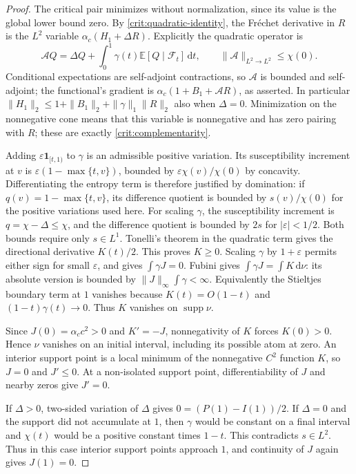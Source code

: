 \documentclass[11pt,a4paper]{article}
\numberwithin{equation}{section}
\theoremstyle{definition}
\theoremstyle{remark}
\newcommand{\E}{\mathbb E}
\newcommand{\dd}{\mathrm d}
\newcommand{\ind}{\mathbf 1}
\newcommand{\eps}{\varepsilon}
\DeclareMathOperator{\supp}{supp}
\begin{document}
\begin{proof}
The critical pair minimizes without normalization, since its value is
the global lower bound zero.  By \eqref{crit:quadratic-identity}, the
Fr\'echet derivative in $R$ is the $L^2$ variable
$\alpha_c(H_1+\Delta R)$.  Explicitly the quadratic operator is
\[
 \mathcal A Q=\Delta Q+
          \int_0^1\gamma(t)\E[Q\mid\mathcal F_t]\,\dd t,
 \qquad \|\mathcal A\|_{L^2\to L^2}\le\chi(0).
\]
Conditional expectations are self-adjoint contractions, so
$\mathcal A$ is bounded and self-adjoint; the functional's gradient is
$\alpha_c(1+B_1+\mathcal AR)$, as asserted.
In particular $\|H_1\|_2\le1+\|B_1\|_2+\|\gamma\|_1\|R\|_2$
also when $\Delta=0$.  Minimization on the nonnegative cone means
that this variable is nonnegative and has zero pairing with $R$;
these are exactly \eqref{crit:complementarity}.

Adding $\eps\ind_{[t,1)}$ to $\gamma$ is an admissible positive
variation.  Its susceptibility increment at $v$ is
$\eps(1-\max\{t,v\})$, bounded by $\eps\chi(v)/\chi(0)$ by
concavity.  Differentiating the entropy term is therefore justified
by domination: if $q(v)=1-\max\{t,v\}$, its difference quotient
is bounded by $s(v)/\chi(0)$ for the positive variations used here.
For scaling $\gamma$, the susceptibility increment is
$q=\chi-\Delta\le\chi$, and the difference quotient is bounded
by $2s$ for $|\eps|<1/2$.  Both bounds require only $s\in L^1$.
Tonelli's theorem in the quadratic term gives
the directional derivative $K(t)/2$.  This proves $K\ge0$.
Scaling $\gamma$ by $1+\eps$ permits either sign for small $\eps$,
and gives $\int\gamma J=0$.  Fubini gives
$\int\gamma J=\int K\,\dd\nu$: its absolute version is bounded by
$\|J\|_\infty\int\gamma<\infty$.  Equivalently the Stieltjes
boundary term at $1$ vanishes because
$K(t)=O(1-t)$ and $(1-t)\gamma(t)\to0$.
Thus $K$ vanishes on $\supp\nu$.

Since $J(0)=\alpha_c c^2>0$ and $K'=-J$, nonnegativity of $K$ forces
$K(0)>0$.  Hence $\nu$ vanishes on an initial interval, including
its possible atom at zero.  An interior support point is a local
minimum of the nonnegative $C^2$ function $K$, so $J=0$ and $J'\le0$.
At a non-isolated support point, differentiability of $J$ and nearby
zeros give $J'=0$.

If $\Delta>0$, two-sided variation of $\Delta$ gives
$0=(P(1)-I(1))/2$.  If $\Delta=0$ and the support did not accumulate
at $1$, then $\gamma$ would be constant on a final interval and
$\chi(t)$ would be a positive constant times $1-t$.  This contradicts
$s\in L^2$.  Thus in this case interior support points approach $1$,
and continuity of $J$ again gives $J(1)=0$.
\end{proof}
\end{document}
